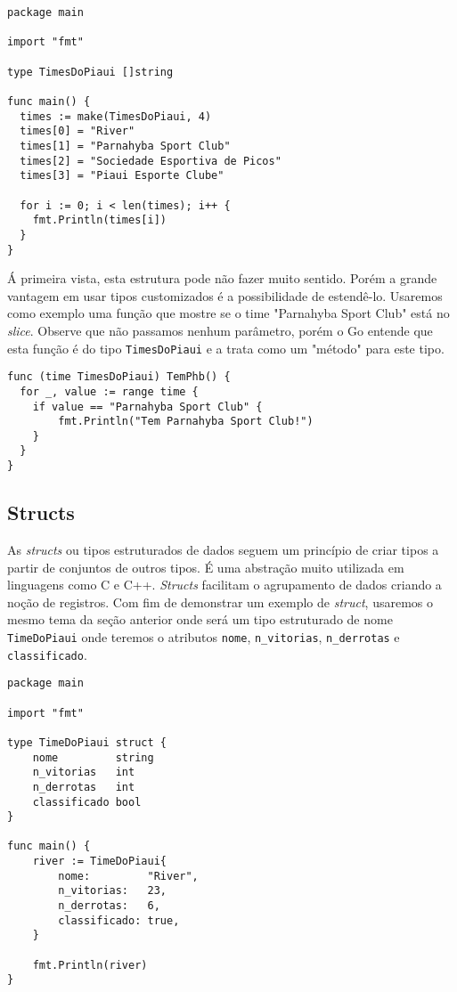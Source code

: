 \documentclass{SBCbookchapter}
\begin{document}
\begin{lstlisting}
package main

import "fmt"

type TimesDoPiaui []string

func main() {	
  times := make(TimesDoPiaui, 4)
  times[0] = "River"
  times[1] = "Parnahyba Sport Club"
  times[2] = "Sociedade Esportiva de Picos"
  times[3] = "Piaui Esporte Clube"

  for i := 0; i < len(times); i++ {
  	fmt.Println(times[i])
  }	
}

\end{lstlisting}

	Á primeira vista, esta estrutura pode não fazer muito sentido. Porém a grande vantagem em usar tipos customizados é a possibilidade de estendê-lo. Usaremos como exemplo uma função que mostre se o time "Parnahyba Sport Club" está no \textit{slice}. Observe que não passamos nenhum parâmetro, porém o Go entende que esta função é do tipo \texttt{TimesDoPiaui} e a trata como um "método" para este tipo.
	
\begin{lstlisting}
func (time TimesDoPiaui) TemPhb() {
  for _, value := range time {
    if value == "Parnahyba Sport Club" {
       	fmt.Println("Tem Parnahyba Sport Club!")
    }
  }
}
\end{lstlisting}
	
\subsection{Structs}

As \textit{structs} ou tipos estruturados de dados seguem um princípio de criar tipos a partir de conjuntos de outros tipos. É uma abstração muito utilizada em linguagens como C e C++. \textit{Structs} facilitam o agrupamento de dados criando a noção de registros. Com fim de demonstrar um exemplo de \textit{struct}, usaremos o mesmo tema da seção anterior onde será  um tipo estruturado de nome \texttt{TimeDoPiaui} onde teremos o atributos \texttt{nome}, \texttt{n\_vitorias}, \texttt{n\_derrotas} e \texttt{classificado}.
	
\begin{lstlisting}
package main

import "fmt"

type TimeDoPiaui struct {
	nome         string
	n_vitorias   int
	n_derrotas   int
	classificado bool
}

func main() {
	river := TimeDoPiaui{
		nome:         "River",
		n_vitorias:   23,
		n_derrotas:   6,
		classificado: true,
	}

	fmt.Println(river)
}

\end{lstlisting}
\end{document}
